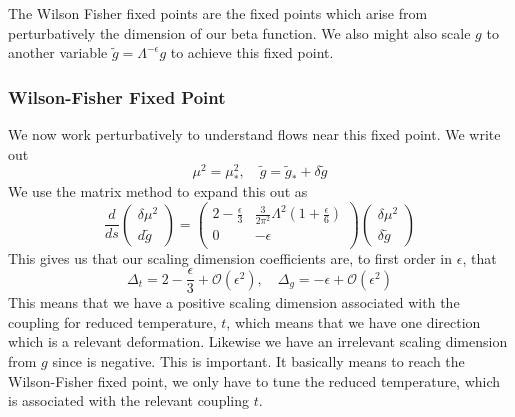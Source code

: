 \begin{defn}
The Wilson Fisher fixed points are the fixed points 
which arise from perturbatively the dimension of our 
beta function. We also might also 
scale $g $ to another variable $\tilde{ g } = \Lambda ^{ - \epsilon } g $
to achieve this fixed point. 
\end{defn}

\subsubsection{Wilson-Fisher Fixed Point} 

We now work perturbatively 
to understand flows near this fixed point. 
We write out 
\[
 \mu ^ 2 = \mu ^ 2 _ * , \quad 
 \tilde{ g } = \tilde{ g } _ * + \delta \tilde{ g }    
\]  We use 
the matrix method to expand this out 
as 
\[
 \frac{d }{ ds } \begin{pmatrix} \delta \mu ^ 2 \\ 
 d \tilde{ g } \end{pmatrix}  = \begin{pmatrix}  
 2 - \frac{\epsilon}{3  } & \frac{ 3 }{ 2 \pi ^ 2 } \Lambda ^ 2 
 ( 1 + \frac{\epsilon }{ 6 } )  \\ 
 0 & - \epsilon  \\ \end{pmatrix} \begin{pmatrix} \delta \mu ^ 2 \\
 \delta \tilde{ g } \end{pmatrix} 
\] This gives us that 
our scaling dimension coefficients 
are, to first order in $ \epsilon $, 
that 
\[
	\Delta _ t = 2 - \frac{ \epsilon }{ 3 } + \mathcal{ O } ( \epsilon ^2 ) , 
	\quad \Delta _g = - \epsilon + \mathcal{ O  } ( \epsilon ^ 2 )  
\]
This means that we have a positive scaling dimension 
associated with the coupling for reduced temperature, $ t $, which means 
that we have one direction which is a relevant deformation. 
Likewise we have an irrelevant scaling dimension from $ g$
since is negative. This is important.  
It basically means to reach the Wilson-Fisher fixed point, 
we only have to tune the reduced temperature, which is associated with 
the relevant coupling $ t$. 

